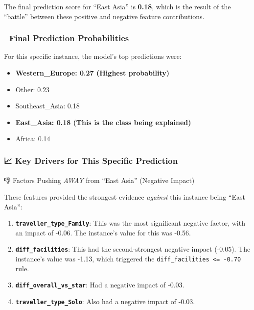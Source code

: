\documentclass[
  letterpaper,
  DIV=11,
  numbers=noendperiod]{scrartcl}
\makeatletter
\let\oldparagraph\paragraph
\renewcommand{\paragraph}{
    \@ifstar
      \xxxParagraphStar
      \xxxParagraphNoStar
  }
\newcommand{\xxxParagraphStar}[1]{\oldparagraph*{#1}\mbox{}}
\newcommand{\xxxParagraphNoStar}[1]{\oldparagraph{#1}\mbox{}}
\providecommand{\tightlist}{%
  \setlength{\itemsep}{0pt}\setlength{\parskip}{0pt}}
\makeatother
\begin{document}
The final prediction score for ``East Asia'' is \textbf{0.18}, which is
the result of the ``battle'' between these positive and negative feature
contributions.

\subsubsection{🧾 Final Prediction
Probabilities}\label{final-prediction-probabilities}

For this specific instance, the model's top predictions were:

\begin{itemize}
\tightlist
\item
  \textbf{Western\_Europe: 0.27 (Highest probability)}
\item
  Other: 0.23
\item
  Southeast\_Asia: 0.18
\item
  \textbf{East\_Asia: 0.18 (This is the class being explained)}
\item
  Africa: 0.14
\end{itemize}

\subsubsection{📈 Key Drivers for This Specific
Prediction}\label{key-drivers-for-this-specific-prediction}

\paragraph{\texorpdfstring{👎 Factors Pushing \emph{AWAY} from ``East
Asia'' (Negative
Impact)}{👎 Factors Pushing AWAY from ``East Asia'' (Negative Impact)}}\label{factors-pushing-away-from-east-asia-negative-impact}

These features provided the strongest evidence \emph{against} this
instance being ``East Asia'':

\begin{enumerate}
\def\labelenumi{\arabic{enumi}.}
\tightlist
\item
  \textbf{\texttt{traveller\_type\_Family}}: This was the most
  significant negative factor, with an impact of -0.06. The instance's
  value for this was -0.56.
\item
  \textbf{\texttt{diff\_facilities}}: This had the second-strongest
  negative impact (-0.05). The instance's value was -1.13, which
  triggered the \texttt{diff\_facilities\ \textless{}=\ -0.70} rule.
\item
  \textbf{\texttt{diff\_overall\_vs\_star}}: Had a negative impact of
  -0.03.
\item
  \textbf{\texttt{traveller\_type\_Solo}}: Also had a negative impact of
  -0.03.
\end{enumerate}
\end{document}
